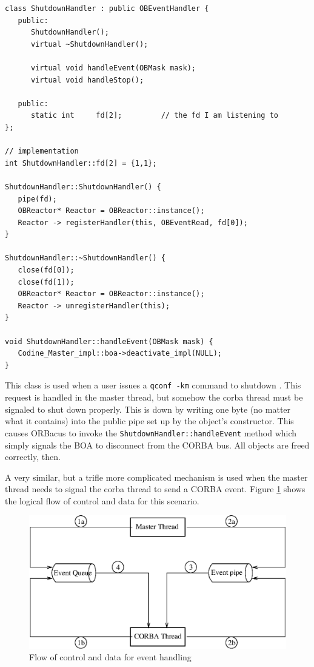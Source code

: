 \begin{Verbatim}[fontsize=\small, frame=single]
class ShutdownHandler : public OBEventHandler {
   public:
      ShutdownHandler(); 
      virtual ~ShutdownHandler(); 

      virtual void handleEvent(OBMask mask); 
      virtual void handleStop();

   public:
      static int     fd[2];         // the fd I am listening to
};

// implementation 
int ShutdownHandler::fd[2] = {1,1};

ShutdownHandler::ShutdownHandler() {
   pipe(fd);
   OBReactor* Reactor = OBReactor::instance(); 
   Reactor -> registerHandler(this, OBEventRead, fd[0]);
}

ShutdownHandler::~ShutdownHandler() {
   close(fd[0]);
   close(fd[1]);
   OBReactor* Reactor = OBReactor::instance();
   Reactor -> unregisterHandler(this);
}

void ShutdownHandler::handleEvent(OBMask mask) {
   Codine_Master_impl::boa->deactivate_impl(NULL);
}
\end{Verbatim}

This class is used when a user issues a \texttt{qconf -km} command to
shutdown \codine. This request is handled in the master thread, but somehow
the corba thread must be signaled to shut down properly. This is down by
writing one byte (no matter what it contains) into the public pipe set up by
the object's constructor. This causes ORBacus to invoke the
\texttt{ShutdownHandler::handleEvent} method which simply signals the BOA to
disconnect from the CORBA bus. All objects are freed correctly, then.

A very similar, but a trifle more complicated mechanism is used when the
master thread needs to signal the corba thread to send a CORBA event. Figure
\ref{f_prog_event} shows the logical flow of control and data 
for this scenario.

\begin{figure}
\includegraphics[width=\textwidth]{eventflow.eps}
\caption{\label{f_prog_event}Flow of control and data for event handling}
\end{figure}

